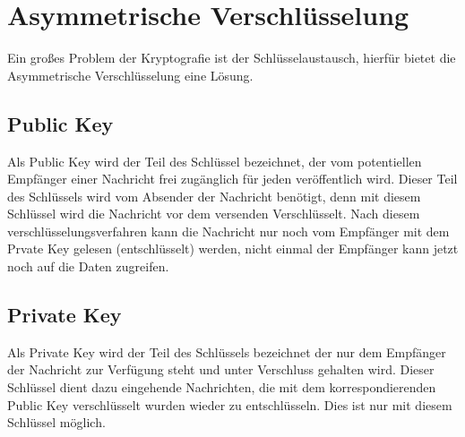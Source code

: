 
\chapter{Asymmetrische Verschlüsselung} %


Ein großes Problem der Kryptografie ist der Schlüsselaustausch, hierfür bietet die Asymmetrische Verschlüsselung eine Lösung.


\section{Public Key}
Als Public Key wird der Teil des Schlüssel bezeichnet, der vom potentiellen Empfänger einer Nachricht frei zugänglich für jeden veröffentlich wird.
Dieser Teil des Schlüssels wird vom Absender der Nachricht benötigt, denn mit diesem Schlüssel wird die Nachricht vor dem versenden Verschlüsselt.
Nach diesem verschlüsselungsverfahren kann die Nachricht nur noch vom Empfänger mit dem Prvate Key gelesen (entschlüsselt) werden, nicht einmal der Empfänger kann jetzt noch auf die  Daten zugreifen.



\section{Private Key}
Als Private Key wird der Teil des Schlüssels bezeichnet der nur dem Empfänger der Nachricht zur Verfügung steht und unter Verschluss gehalten wird.
Dieser Schlüssel dient dazu eingehende Nachrichten, die mit dem korrespondierenden Public Key verschlüsselt wurden wieder zu entschlüsseln.
Dies ist nur mit diesem Schlüssel möglich.



